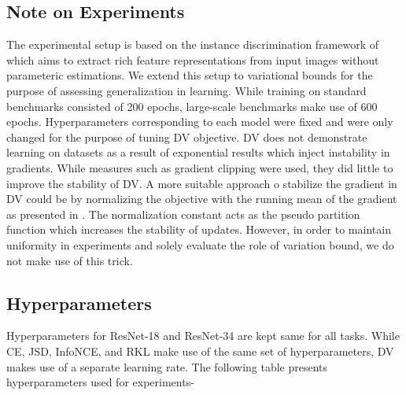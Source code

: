 \documentclass{article}
\begin{document}
\subsection{Note on Experiments}
The experimental setup is based on the instance discrimination framework of \cite{visual} which aims to extract rich feature representations from input images without parameteric estimations. We extend this setup to variational bounds for the purpose of assessing generalization in learning. While training on standard benchmarks consisted of 200 epochs, large-scale benchmarks make use of 600 epochs. Hyperparameters corresponding to each model were fixed and were only changed for the purpose of tuning DV objective. DV does not demonstrate learning on datasets as a result of exponential results which inject instability in gradients. While measures such as gradient clipping were used, they did little to improve the stability of DV. A more suitable approach o stabilize the gradient in DV could be by normalizing the objective with the running mean of the gradient as presented in \cite{infomax}. The normalization constant acts as the pseudo partition function which increases the stability of updates. However, in order to maintain uniformity in experiments and solely evaluate the role of variation bound, we do not make use of this trick. 

\subsection{Hyperparameters}
Hyperparameters for ResNet-18 and ResNet-34 are kept same for all tasks. While CE, JSD, InfoNCE, and RKL make use of the same set of hyperparameters, DV makes use of a separate learning rate. The following table presents hyperparameters used for experiments-
\end{document}
